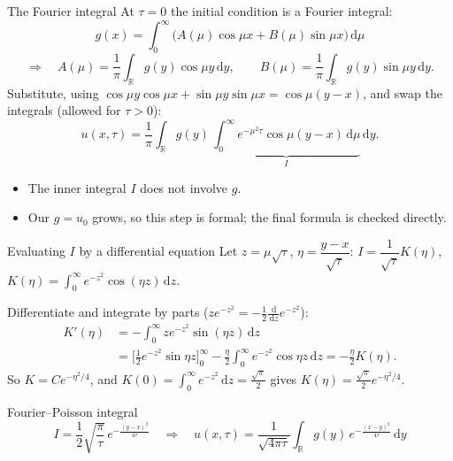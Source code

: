 \documentclass[11pt]{beamer}
\newcommand{\dd}{\,\mathrm d}
\begin{document}
\begin{frame}{The Fourier integral}
  At $\tau=0$ the initial condition is a Fourier integral:
  \[
    g(x)=\int_0^\infty\big(A(\mu)\cos\mu x+B(\mu)\sin\mu x\big)\dd\mu
  \]
  \[
    \Rightarrow\quad
    A(\mu)=\frac1\pi\int_{\mathbb R}g(y)\cos\mu y\dd y,\qquad
    B(\mu)=\frac1\pi\int_{\mathbb R}g(y)\sin\mu y\dd y .
  \]
  Substitute, using $\cos\mu y\cos\mu x+\sin\mu y\sin\mu x=\cos\mu(y-x)$, and swap the integrals
  (allowed for $\tau>0$):
  \[
    u(x,\tau)=\frac1\pi\int_{\mathbb R}g(y)\,
    \underbrace{\int_0^\infty e^{-\mu^2\tau}\cos\mu(y-x)\dd\mu}_{I}\dd y .
  \]
  \begin{itemize}
    \item The inner integral $I$ does not involve $g$.
    \item Our $g=u_0$ grows, so this step is formal; the final formula is checked directly.
  \end{itemize}
\end{frame}

\begin{frame}{Evaluating $I$ by a differential equation}
  Let $z=\mu\sqrt\tau$, $\eta=\dfrac{y-x}{\sqrt\tau}$: \quad
  $I=\dfrac1{\sqrt\tau}K(\eta)$, \quad $K(\eta)=\displaystyle\int_0^\infty e^{-z^2}\cos(\eta z)\dd z$.
  \vspace{2pt}

  Differentiate and integrate by parts ($ze^{-z^2}=-\frac12\frac{\dd}{\dd z}e^{-z^2}$):
  {\small
  \begin{align*}
    K'(\eta)&=-\int_0^\infty ze^{-z^2}\sin(\eta z)\dd z\\
    &=\Big[\tfrac12e^{-z^2}\sin\eta z\Big]_0^\infty-\frac\eta2\int_0^\infty e^{-z^2}\cos\eta z\dd z
    =-\frac\eta2K(\eta).
  \end{align*}}
  So $K=Ce^{-\eta^2/4}$, and $K(0)=\int_0^\infty e^{-z^2}\dd z=\frac{\sqrt\pi}{2}$ gives
  $K(\eta)=\frac{\sqrt\pi}{2}e^{-\eta^2/4}$.
  \begin{block}{Fourier--Poisson integral}
    \[
      I=\frac12\sqrt{\frac\pi\tau}\,e^{-\frac{(y-x)^2}{4\tau}}
      \quad\Rightarrow\quad
      u(x,\tau)=\frac{1}{\sqrt{4\pi\tau}}\int_{\mathbb R}g(y)\,e^{-\frac{(x-y)^2}{4\tau}}\dd y
    \]
  \end{block}
\end{frame}
\end{document}
